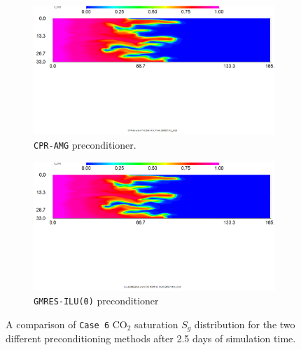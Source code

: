 \begin{figure}[h!]
\centering
\begin{subfigure}{.5\textwidth}
  \centering
  \includegraphics[width=1\linewidth]{figures/case6_cpr_co2.png}
  \caption{\texttt{CPR-AMG} preconditioner.}
\end{subfigure}%
\begin{subfigure}{.5\textwidth}
  \centering
  \includegraphics[width=1\linewidth]{figures/case6_ilu_co2.png}
  \caption{\texttt{GMRES-ILU(0)} preconditioner}
\end{subfigure}
\caption{A comparison of \texttt{Case 6} CO$_{2}$ saturation $S_{g}$ distribution for the two different preconditioning methods after 2.5 days of simulation time.}
\label{viscoussg}
\end{figure}

